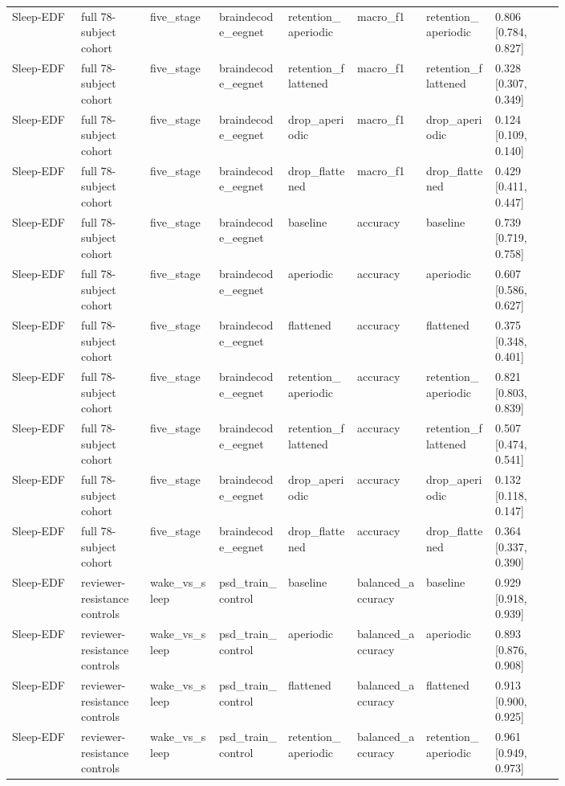 \begin{longtable}{p{0.10\linewidth}p{0.10\linewidth}p{0.10\linewidth}p{0.10\linewidth}p{0.10\linewidth}p{0.10\linewidth}p{0.10\linewidth}p{0.10\linewidth}}
Sleep-EDF & full 78-subject cohort & five\_stage & braindecode\_eegnet & retention\_aperiodic & macro\_f1 & retention\_aperiodic & 0.806 [0.784, 0.827]\\
Sleep-EDF & full 78-subject cohort & five\_stage & braindecode\_eegnet & retention\_flattened & macro\_f1 & retention\_flattened & 0.328 [0.307, 0.349]\\
Sleep-EDF & full 78-subject cohort & five\_stage & braindecode\_eegnet & drop\_aperiodic & macro\_f1 & drop\_aperiodic & 0.124 [0.109, 0.140]\\
Sleep-EDF & full 78-subject cohort & five\_stage & braindecode\_eegnet & drop\_flattened & macro\_f1 & drop\_flattened & 0.429 [0.411, 0.447]\\
Sleep-EDF & full 78-subject cohort & five\_stage & braindecode\_eegnet & baseline & accuracy & baseline & 0.739 [0.719, 0.758]\\
Sleep-EDF & full 78-subject cohort & five\_stage & braindecode\_eegnet & aperiodic & accuracy & aperiodic & 0.607 [0.586, 0.627]\\
Sleep-EDF & full 78-subject cohort & five\_stage & braindecode\_eegnet & flattened & accuracy & flattened & 0.375 [0.348, 0.401]\\
Sleep-EDF & full 78-subject cohort & five\_stage & braindecode\_eegnet & retention\_aperiodic & accuracy & retention\_aperiodic & 0.821 [0.803, 0.839]\\
Sleep-EDF & full 78-subject cohort & five\_stage & braindecode\_eegnet & retention\_flattened & accuracy & retention\_flattened & 0.507 [0.474, 0.541]\\
Sleep-EDF & full 78-subject cohort & five\_stage & braindecode\_eegnet & drop\_aperiodic & accuracy & drop\_aperiodic & 0.132 [0.118, 0.147]\\
Sleep-EDF & full 78-subject cohort & five\_stage & braindecode\_eegnet & drop\_flattened & accuracy & drop\_flattened & 0.364 [0.337, 0.390]\\
Sleep-EDF & reviewer-resistance controls & wake\_vs\_sleep & psd\_train\_control & baseline & balanced\_accuracy & baseline & 0.929 [0.918, 0.939]\\
Sleep-EDF & reviewer-resistance controls & wake\_vs\_sleep & psd\_train\_control & aperiodic & balanced\_accuracy & aperiodic & 0.893 [0.876, 0.908]\\
Sleep-EDF & reviewer-resistance controls & wake\_vs\_sleep & psd\_train\_control & flattened & balanced\_accuracy & flattened & 0.913 [0.900, 0.925]\\
Sleep-EDF & reviewer-resistance controls & wake\_vs\_sleep & psd\_train\_control & retention\_aperiodic & balanced\_accuracy & retention\_aperiodic & 0.961 [0.949, 0.973]\\

\end{longtable}
